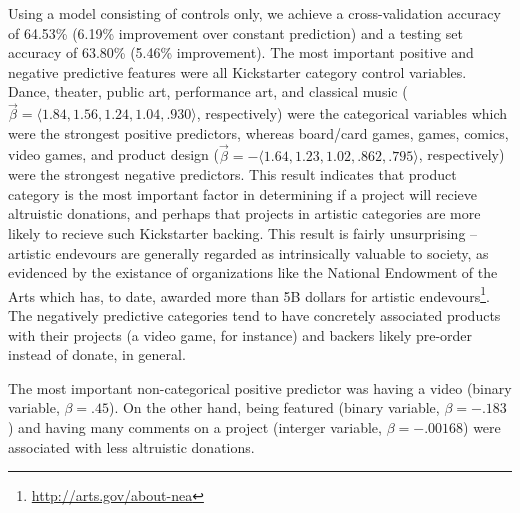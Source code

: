 \documentclass[letterpaper]{article}
\begin{document}
Using a model consisting of controls only, we achieve a cross-validation accuracy of 64.53\% (6.19\% improvement over constant prediction) and a testing set accuracy of 63.80\% (5.46\% improvement). The most important positive and negative predictive features were all Kickstarter category control variables. Dance, theater, public art, performance art, and classical music ($\vec{\beta} = \langle 1.84, 1.56, 1.24, 1.04, .930 \rangle$, respectively) were the categorical variables which were the strongest positive predictors, whereas board/card games, games, comics, video games, and product design ($\vec{\beta} = -\langle 1.64, 1.23, 1.02, .862, .795 \rangle$, respectively) were the strongest negative predictors. This result indicates that product category is the most important factor in determining if a project will recieve altruistic donations, and perhaps that projects in artistic categories are more likely to recieve such Kickstarter backing. This result is fairly unsurprising -- artistic endevours are generally regarded as intrinsically valuable to society, as evidenced by the existance of organizations like the National Endowment of the Arts which has, to date, awarded more than 5B dollars for artistic endevours\footnote{\url{http://arts.gov/about-nea}}. The negatively predictive categories tend to have concretely associated products with their projects (a video game, for instance) and backers likely pre-order instead of donate, in general.

The most important non-categorical positive predictor was having a video (binary variable, $\beta = .45$). On the other hand, being featured (binary variable, $\beta = -.183$) and having many comments on a project (interger variable, $\beta = -.00168$) were associated with less altruistic donations.
\end{document}
